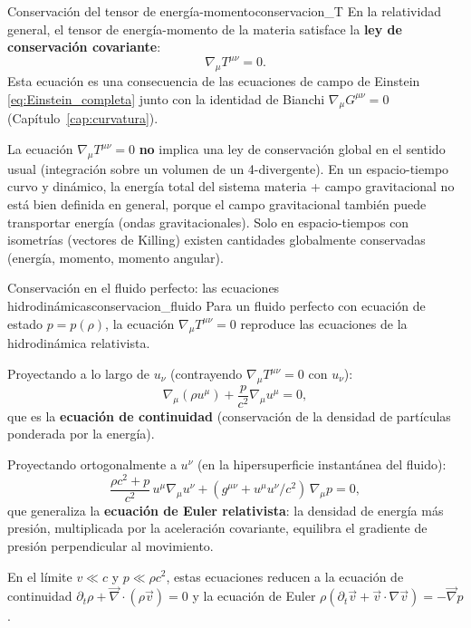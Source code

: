 \begin{teorema}{Conservación del tensor de energía-momento}{conservacion_T}
En la relatividad general, el tensor de energía-momento de la materia satisface la \textbf{ley de conservación covariante}:
\begin{equation}
  \nabla_\mu T^{\mu\nu} = 0.
  \label{eq:conservacion_T}
\end{equation}
Esta ecuación es una consecuencia de las ecuaciones de campo de Einstein \eqref{eq:Einstein_completa} junto con la identidad de Bianchi $\nabla_\mu G^{\mu\nu} = 0$ (Capítulo~\ref{cap:curvatura}).
\end{teorema}

\begin{importante}
La ecuación $\nabla_\mu T^{\mu\nu} = 0$ \textbf{no} implica una ley de conservación global en el sentido usual (integración sobre un volumen de un 4-divergente). En un espacio-tiempo curvo y dinámico, la energía total del sistema materia + campo gravitacional no está bien definida en general, porque el campo gravitacional también puede transportar energía (ondas gravitacionales). Solo en espacio-tiempos con isometrías (vectores de Killing) existen cantidades globalmente conservadas (energía, momento, momento angular).
\end{importante}

\begin{ejemplo}{Conservación en el fluido perfecto: las ecuaciones hidrodinámicas}{conservacion_fluido}
Para un fluido perfecto con ecuación de estado $p = p(\rho)$, la ecuación $\nabla_\mu T^{\mu\nu} = 0$ reproduce las ecuaciones de la hidrodinámica relativista.

Proyectando a lo largo de $u_\nu$ (contrayendo $\nabla_\mu T^{\mu\nu} = 0$ con $u_\nu$):
\begin{equation}
  \nabla_\mu(\rho u^\mu) + \frac{p}{c^2}\nabla_\mu u^\mu = 0,
  \label{eq:continuidad_fluido}
\end{equation}
que es la \textbf{ecuación de continuidad} (conservación de la densidad de partículas ponderada por la energía).

Proyectando ortogonalmente a $u^\nu$ (en la hipersuperficie instantánea del fluido):
\begin{equation}
  \frac{\rho c^2 + p}{c^2}\,u^\mu \nabla_\mu u^\nu + (g^{\mu\nu} + u^\mu u^\nu/c^2)\,\nabla_\mu p = 0,
  \label{eq:euler_rel}
\end{equation}
que generaliza la \textbf{ecuación de Euler relativista}: la densidad de energía más presión, multiplicada por la aceleración covariante, equilibra el gradiente de presión perpendicular al movimiento.

En el límite $v \ll c$ y $p \ll \rho c^2$, estas ecuaciones reducen a la ecuación de continuidad $\partial_t\rho + \vec{\nabla}\cdot(\rho\vec{v}) = 0$ y la ecuación de Euler $\rho(\partial_t\vec{v} + \vec{v}\cdot\nabla\vec{v}) = -\vec{\nabla}p$.
\end{ejemplo}

